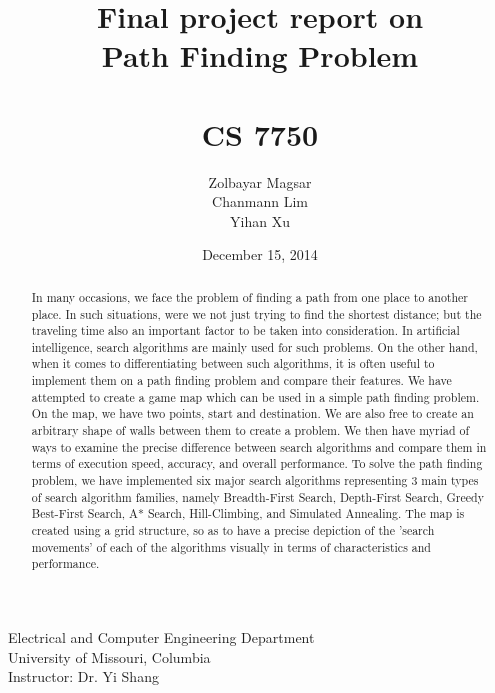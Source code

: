 \documentclass[a4paper]{article}
\title{Final project report on \\Path Finding Problem \\~ \\ CS 7750} %
\author{Zolbayar Magsar \\Chanmann Lim \\Yihan Xu}
\date{December 15, 2014}
\begin{document}
\maketitle %

\lstset{language=Java,title=\lstname,basicstyle=\footnotesize}

\begin{center}
Electrical and Computer Engineering Department \\
University of Missouri, Columbia \\
\vspace{.5 in}
Instructor: Dr. Yi Shang \\
\end{center}

\vspace{1 in}

\begin{abstract}
In many occasions, we face the problem of finding a path from one place to another place. In such situations, were we not just trying to find the shortest distance; but the traveling time also an important factor to be taken into consideration. In artificial intelligence, search algorithms are mainly used for such problems. On the other hand, when it comes to differentiating between such algorithms, it is often useful to implement them on a path finding problem and compare their features. We have attempted to create a game map which can be used in a simple path finding problem. On the map, we have two points, start and destination. We are also free to create an arbitrary shape of walls between them to create a problem. We then have myriad of ways to examine the precise difference between search algorithms and compare them in terms of execution speed, accuracy, and overall performance. To solve the path finding problem, we have implemented six major search algorithms representing 3 main types of search algorithm families, namely Breadth-First Search, Depth-First Search, Greedy Best-First Search, A* Search, Hill-Climbing, and Simulated Annealing. The map is created using a grid structure, so as to have a precise depiction of the 'search movements' of each of the algorithms visually in terms of characteristics and performance.
\end{abstract}


\end{document}
